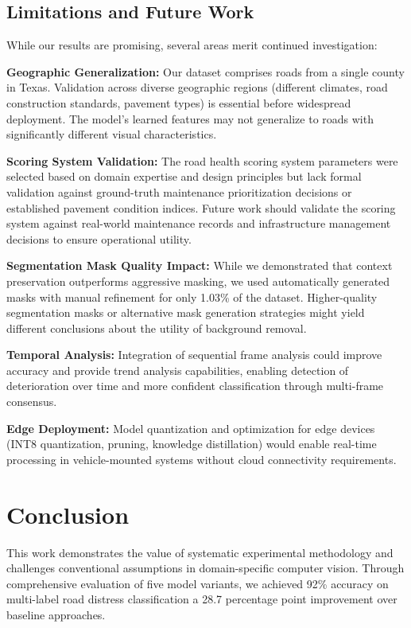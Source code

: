 \documentclass[12pt]{article}
\begin{document}
\subsection{Limitations and Future Work}

While our results are promising, several areas merit continued investigation:

\textbf{Geographic Generalization:} Our dataset comprises roads from a single county in Texas. Validation across diverse geographic regions (different climates, road construction standards, pavement types) is essential before widespread deployment. The model's learned features may not generalize to roads with significantly different visual characteristics.

\textbf{Scoring System Validation:} The road health scoring system parameters were selected based on domain expertise and design principles but lack formal validation against ground-truth maintenance prioritization decisions or established pavement condition indices. Future work should validate the scoring system against real-world maintenance records and infrastructure management decisions to ensure operational utility.

\textbf{Segmentation Mask Quality Impact:} While we demonstrated that context preservation outperforms aggressive masking, we used automatically generated masks with manual refinement for only 1.03\% of the dataset. Higher-quality segmentation masks or alternative mask generation strategies might yield different conclusions about the utility of background removal.

\textbf{Temporal Analysis:} Integration of sequential frame analysis could improve accuracy and provide trend analysis capabilities, enabling detection of deterioration over time and more confident classification through multi-frame consensus.

\textbf{Edge Deployment:} Model quantization and optimization for edge devices (INT8 quantization, pruning, knowledge distillation) would enable real-time processing in vehicle-mounted systems without cloud connectivity requirements.

\section{Conclusion}

This work demonstrates the value of systematic experimental methodology and challenges conventional assumptions in domain-specific computer vision. Through comprehensive evaluation of five model variants, we achieved 92\% accuracy on multi-label road distress classification a 28.7 percentage point improvement over baseline approaches.
\end{document}
